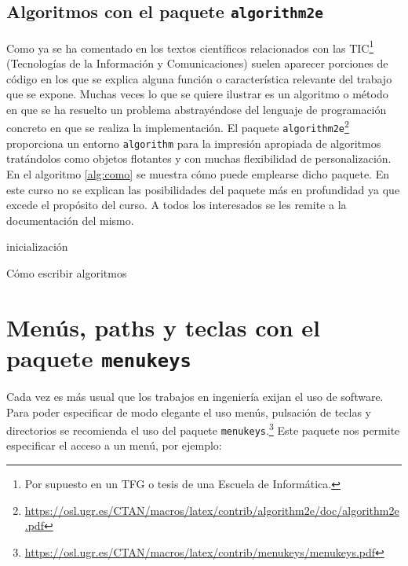 \subsection{Algoritmos con el paquete \texttt{algorithm2e}}
Como ya se ha comentado en los textos científicos relacionados con las TIC\footnote{Por supuesto en un TFG o tesis de una Escuela de Informática.} (Tecnologías de la Información y Comunicaciones) suelen aparecer porciones de código en los que se explica alguna función o característica relevante del trabajo que se expone. Muchas veces lo que se quiere ilustrar es un algoritmo o método en que se ha resuelto un problema abstrayéndose del lenguaje de programación concreto en que se realiza la implementación. El paquete \texttt{algorithm2e}\footnote{\url{https://osl.ugr.es/CTAN/macros/latex/contrib/algorithm2e/doc/algorithm2e.pdf}} proporciona un entorno \texttt{algorithm} para la impresión apropiada de algoritmos tratándolos como objetos flotantes y con muchas flexibilidad de personalización. En el algoritmo \ref{alg:como} se muestra cómo puede emplearse dicho paquete. En este curso no se explican las posibilidades del paquete más en profundidad ya que excede el propósito del curso. A todos los interesados se les remite a la documentación del mismo.


\IncMargin{1em}
\begin{algorithm}
\LinesNumbered
\SetAlgoLined


inicialización\;

\caption{Cómo escribir algoritmos}\label{alg:como}
\end{algorithm}\DecMargin{1em}

\newpage

\section{Menús, paths y teclas con el paquete \texttt{menukeys}}
Cada vez es más usual que los trabajos en ingeniería exijan el uso de software. Para poder especificar de modo elegante el uso menús, pulsación de teclas y directorios se recomienda el uso del paquete \texttt{menukeys}.\footnote{\url{https://osl.ugr.es/CTAN/macros/latex/contrib/menukeys/menukeys.pdf}} Este paquete nos permite especificar el acceso a un menú, por ejemplo:

